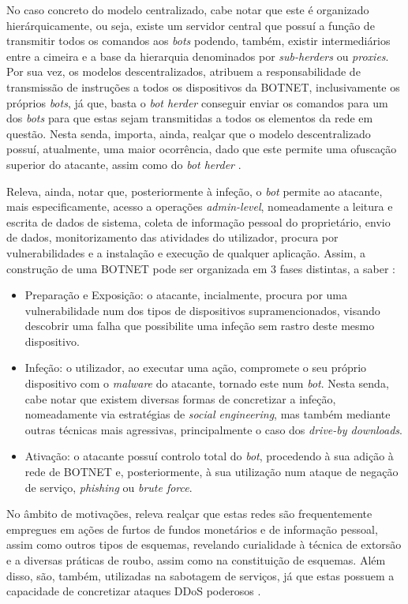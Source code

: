 No caso concreto do modelo centralizado, cabe notar que este é organizado hierárquicamente, ou seja, existe um servidor central que possuí a função de transmitir todos os comandos aos \textit{bots} podendo, também, existir intermediários entre a cimeira e a base da hierarquia denominados por \textit{sub-herders} ou \textit{proxies}. Por sua vez, os modelos descentralizados, atribuem a responsabilidade de transmissão de instruções a todos os dispositivos da BOTNET, inclusivamente os próprios \textit{bots}, já que, basta o \textit{bot herder} conseguir enviar os comandos para um dos \textit{bots} para que estas sejam transmitidas a todos os elementos da rede em questão. Nesta senda, importa, ainda, realçar que o modelo descentralizado possuí, atualmente, uma maior ocorrência, dado que este permite uma ofuscação superior do atacante, assim como do \textit{bot herder} \cite{kaspersky_botnets_2017}.


Releva, ainda, notar que, posteriormente à infeção, o \textit{bot} permite ao atacante, mais especificamente, acesso a operações \textit{admin-level}, nomeadamente a leitura e escrita de dados de sistema, coleta de informação pessoal do proprietário, envio de dados, monitorizamento das atividades do utilizador, procura por vulnerabilidades e a instalação e execução de qualquer aplicação. Assim, a construção de uma BOTNET pode ser organizada em 3 fases distintas, a saber \cite{kaspersky_botnets_2017}:
\begin{itemize}
    \item Preparação e Exposição: o atacante, incialmente, procura por uma vulnerabilidade num dos tipos de dispositivos supramencionados, visando descobrir uma falha que possibilite uma infeção sem rastro deste mesmo dispositivo.
    \item Infeção: o utilizador, ao executar uma ação, compromete o seu próprio dispositivo com o \textit{malware} do atacante, tornado este num \textit{bot}. Nesta senda, cabe notar que existem diversas formas de concretizar a infeção, nomeadamente via estratégias de \textit{social engineering}, mas também mediante outras técnicas mais agressivas, principalmente o caso dos \textit{drive-by downloads}.
    \item Ativação: o atacante possuí controlo total do \textit{bot}, procedendo à sua adição à rede de BOTNET e, posteriormente, à sua utilização num ataque de negação de serviço, \textit{phishing} ou \textit{brute force}.
\end{itemize}

No âmbito de motivações, releva realçar que estas redes são frequentemente empregues em ações de furtos de fundos monetários e de informação pessoal, assim como outros tipos de esquemas, revelando curialidade à técnica de extorsão e a diversas práticas de roubo, assim como na constituição de esquemas. Além disso, são, também, utilizadas na sabotagem de serviços, já que estas possuem a capacidade de concretizar ataques DDoS poderosos \cite{kaspersky_botnets_2017}.

